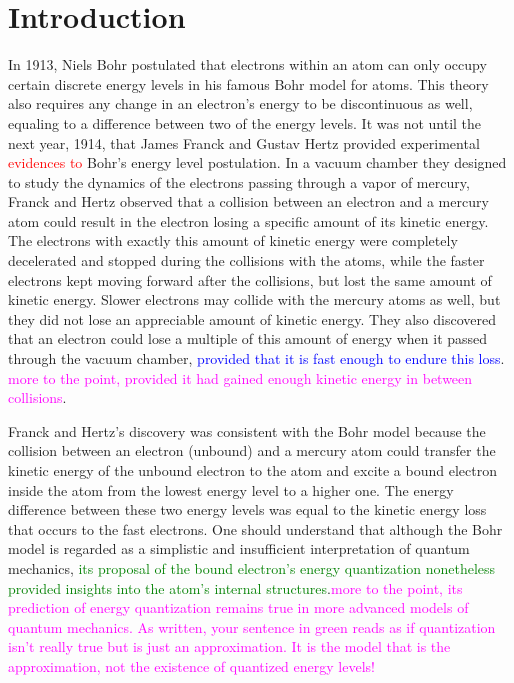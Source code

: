 \documentclass[prb,preprint]{revtex4-1}
\begin{document}
\maketitle 

\section{Introduction}
\label{introduction}

In 1913, Niels Bohr postulated that electrons within an atom can only occupy certain discrete energy levels in his famous Bohr model for atoms. This theory also requires any change in an electron's energy to be discontinuous as well, equaling to a difference between two of the energy levels. It was not until the next year, 1914, that James Franck and Gustav Hertz provided experimental \textcolor{red}{evidences to} Bohr's energy level postulation. In a vacuum chamber they designed to study the dynamics of the electrons passing through a vapor of mercury, Franck and Hertz observed that a collision between an electron and a mercury atom could result in the electron losing a specific amount of its kinetic energy. The electrons with exactly this amount of kinetic energy were completely decelerated and stopped during the collisions with the atoms, while the faster electrons kept moving forward after the collisions, but lost the same amount of kinetic energy. Slower electrons may collide with the mercury atoms as well, but they did not lose an appreciable amount of kinetic energy.  They also discovered that an electron could lose a multiple of this amount of energy when it passed through the vacuum chamber, \textcolor{blue}{provided that it is fast enough to endure this loss}. \textcolor{magenta}{more to the point, provided it had gained enough kinetic energy in between collisions}. 

Franck and Hertz's discovery was consistent with the Bohr model because the collision between an electron (unbound) and a mercury atom could transfer the kinetic energy of the unbound electron to the atom and excite a bound electron inside the atom from the lowest energy level to a higher one. The energy difference between these two energy levels was equal to the kinetic energy loss that occurs to the fast electrons. One should understand that although the Bohr model is regarded as a simplistic and insufficient interpretation of quantum mechanics, \textcolor{green}{its proposal of the bound electron's energy quantization nonetheless provided insights into the atom's internal structures}.\textcolor{magenta}{more to the point, its prediction of energy quantization remains true in more advanced models of quantum mechanics. As written, your sentence in green reads as if quantization isn't really true but is just an approximation. It is the model that is the approximation, not the existence of quantized energy levels! } 
\end{document}
